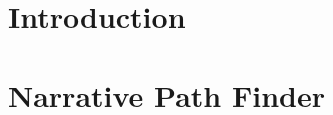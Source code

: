 \documentclass{article}
\begin{document}
\newpage
\section{Introduction}


\section{Narrative Path Finder}

\end{document}
